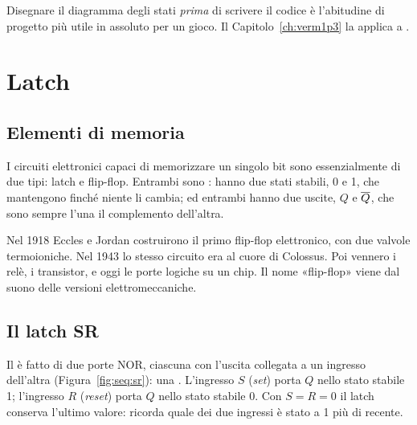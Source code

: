 \begin{prgconcept}
Disegnare il diagramma degli stati \emph{prima} di scrivere il codice è
l'abitudine di progetto più utile in assoluto per un gioco. Il
Capitolo~\ref{ch:verm1p3} la applica a \vermone.
\end{prgconcept}

\section{Latch}

\subsection{Elementi di memoria}

I circuiti elettronici capaci di memorizzare un singolo bit sono
essenzialmente di due tipi: latch e flip-flop. Entrambi sono :
hanno due stati stabili, 0 e 1, che mantengono finché niente li cambia; ed
entrambi hanno due uscite, $Q$ e $\overline{Q}$, che sono sempre l'una il
complemento dell'altra.

\begin{prgaside}
Nel 1918 Eccles e Jordan costruirono il primo flip-flop elettronico, con due
valvole termoioniche. Nel 1943 lo stesso circuito era al cuore di Colossus. Poi
vennero i relè, i transistor, e oggi le porte logiche su un chip. Il nome
«flip-flop» viene dal suono delle versioni elettromeccaniche.
\end{prgaside}

\subsection{Il latch SR}

Il  è fatto di due porte NOR, ciascuna con l'uscita collegata a
un ingresso dell'altra (Figura~\ref{fig:seq:sr}): una .
L'ingresso $S$ (\emph{set}) porta $Q$ nello stato stabile 1; l'ingresso $R$
(\emph{reset}) porta $Q$ nello stato stabile 0. Con $S=R=0$ il latch conserva
l'ultimo valore: ricorda quale dei due ingressi è stato a 1 più di recente.

